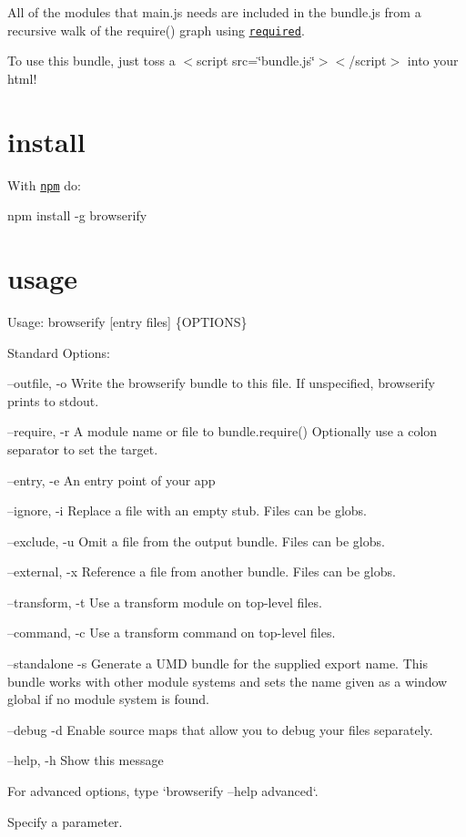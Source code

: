 

All of the modules that {\ttfamily main.\+js} needs are included in the {\ttfamily bundle.\+js} from a recursive walk of the {\ttfamily require()} graph using \href{https://github.com/defunctzombie/node-required}{\tt required}.

To use this bundle, just toss a {\ttfamily $<$script src=\char`\"{}bundle.\+js\char`\"{}$>$$<$/script$>$} into your html!

\section*{install}

With \href{https://www.npmjs.com/}{\tt npm} do\+:


\begin{DoxyCode}
npm install -g browserify
\end{DoxyCode}


\section*{usage}


\begin{DoxyCode}
Usage: browserify [entry files] \{OPTIONS\}

Standard Options:

    --outfile, -o  Write the browserify bundle to this file.
                   If unspecified, browserify prints to stdout.

    --require, -r  A module name or file to bundle.require()
                   Optionally use a colon separator to set the target.

      --entry, -e  An entry point of your app

     --ignore, -i  Replace a file with an empty stub. Files can be globs.

    --exclude, -u  Omit a file from the output bundle. Files can be globs.

   --external, -x  Reference a file from another bundle. Files can be globs.

  --transform, -t  Use a transform module on top-level files.

    --command, -c  Use a transform command on top-level files.

  --standalone -s  Generate a UMD bundle for the supplied export name.
                   This bundle works with other module systems and sets the name
                   given as a window global if no module system is found.

       --debug -d  Enable source maps that allow you to debug your files
                   separately.

       --help, -h  Show this message

For advanced options, type `browserify --help advanced`.

Specify a parameter.
\end{DoxyCode}


